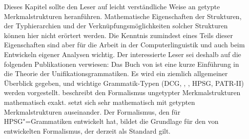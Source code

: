 Dieses Kapitel sollte den Leser auf leicht verständliche Weise an getypte Merkmalstrukturen heranführen.
Mathematische Eigenschaften der Strukturen, der Typhierarchien und der Verknüpfungsmöglichkeiten
solcher Strukturen können hier nicht erörtert werden. Die Kenntnis zumindest eines Teils dieser Eigenschaften
sind aber für die Arbeit in der Computerlinguistik und auch beim Entwickeln eigener Analysen
wichtig. Der interessierte Leser sei deshalb auf die folgenden Publikationen verwiesen:
%
Das Buch von \citet{Shieber86a} ist eine kurze Einführung in die Theorie der
Unifikationsgrammatiken. Es wird ein ziemlich allgemeiner Überblick gegeben, 
und wichtige Grammatik-Typen (DCG, 
\lfg, \gpsg, HPSG, PATR-II) werden vorgestellt.
%
\citet{Johnson88}
beschreibt den Formalismus ungetypter Merkmalstrukturen mathematisch exakt.
%
\citet{Carpenter92a} setzt sich sehr mathematisch mit getypten Merkmalstrukturen auseinander.  Der
Formalismus, den \citet{King99a-u} für HPSG"=Grammatiken entwickelt hat, bildet die Grundlage für
den von \citet{Richter2004a-u} entwickelten Formalismus, der derzeit als Standard gilt.


